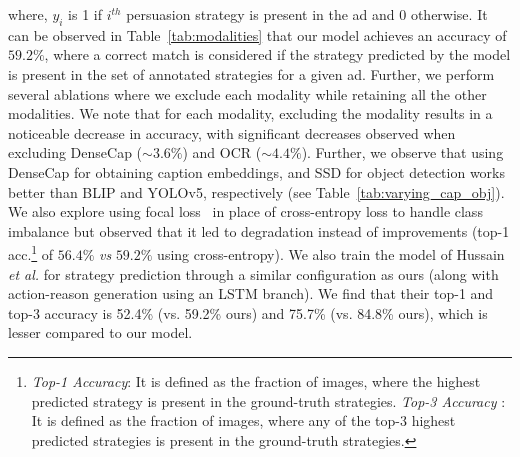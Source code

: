 \documentclass[hidelinks,11pt,a4paper]{report}
\renewcommand{\cite}[1]{\citep{#1}}
\begin{document}
where, $y_i$ is 1 if $i^{th}$ persuasion strategy is present in the ad and 0 otherwise. It can be observed in Table~\ref{tab:modalities} that our model achieves an accuracy of $59.2\%$, where a correct match is considered if the strategy predicted by the model is present in the set of annotated strategies for a given ad. Further, we perform several ablations where we exclude each modality while retaining all the other modalities. We note that for each modality, excluding the modality results in a noticeable decrease in accuracy, with significant decreases observed when excluding DenseCap ($\sim3.6\%$) and OCR ($\sim4.4\%$). Further, we observe that using DenseCap for obtaining caption embeddings, and SSD for object detection works better than BLIP and YOLOv5, respectively (see Table~\ref{tab:varying_cap_obj}). We also explore using focal loss~\cite{lin2017focal} in place of cross-entropy loss to handle class imbalance but observed that it led to degradation instead of improvements (top-1 acc.\footnote{\textit{Top-1 Accuracy}: It is defined as the fraction of images, where the highest predicted strategy is present in the ground-truth strategies. \textit{Top-3 Accuracy} : It is defined as the fraction of images, where any of the top-3 highest predicted strategies is present in the ground-truth strategies.} of $56.4\%$ \textit{vs} $59.2\%$ using cross-entropy). We also train the model of Hussain \textit{et al.} \cite{hussain2017automatic} for strategy prediction through a similar configuration as ours (along with action-reason generation using an LSTM branch). We find that their top-1 and top-3 accuracy is 52.4\% (vs. 59.2\% ours) and 75.7\% (vs. 84.8\% ours), which is lesser compared to our model.
\end{document}
